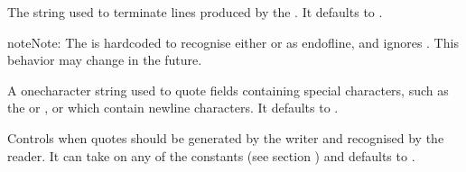 \documentclass[letterpaper,10pt,english]{sphinxmanual}
\begin{document}
\begin{fulllineitems}
\label{\detokenize{csv:csv.Dialect.lineterminator}}
The string used to terminate lines produced by the {\hyperref[\detokenize{csv:csv.writer}]{}}. It defaults
to .

\begin{sphinxadmonition}{note}{Note:}
The {\hyperref[\detokenize{csv:csv.reader}]{}} is hard\sphinxhyphen{}coded to recognise either  or  as
end\sphinxhyphen{}of\sphinxhyphen{}line, and ignores . This behavior may change in the
future.
\end{sphinxadmonition}

\end{fulllineitems}


\vspace{5px}

\begin{fulllineitems}
\label{\detokenize{csv:csv.Dialect.quotechar}}
A one\sphinxhyphen{}character string used to quote fields containing special characters, such
as the  or , or which contain new\sphinxhyphen{}line characters.  It
defaults to .

\end{fulllineitems}


\vspace{5px}

\begin{fulllineitems}
\label{\detokenize{csv:csv.Dialect.quoting}}
Controls when quotes should be generated by the writer and recognised by the
reader.  It can take on any of the  constants (see section
{\hyperref[\detokenize{csv:csv-contents}]{}}) and defaults to {\hyperref[\detokenize{csv:csv.QUOTE_MINIMAL}]{}}.

\end{fulllineitems}
\end{document}
